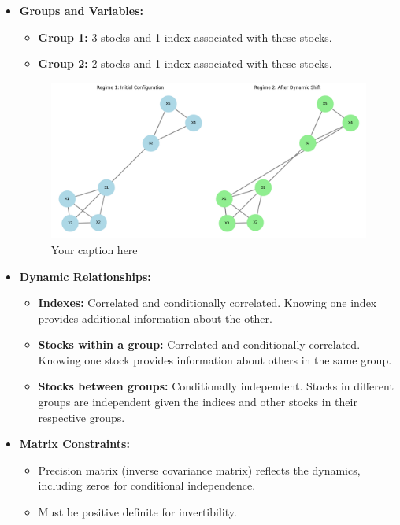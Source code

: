 \documentclass{article}
\begin{document}
\begin{itemize}
    \item \textbf{Groups and Variables:}
    \begin{itemize}
        \item \textbf{Group 1:} 3 stocks and 1 index associated with these stocks.
        \item \textbf{Group 2:} 2 stocks and 1 index associated with these stocks.
    \end{itemize}

    \begin{figure}[h!]
    \centering
    \includegraphics[width=\textwidth]{synthetic_data.png}
    \caption{Your caption here}
    \label{fig:label}
\end{figure}


    \item \textbf{Dynamic Relationships:}
    \begin{itemize}
        \item \textbf{Indexes:} Correlated and conditionally correlated. Knowing one index provides additional information about the other.
        \item \textbf{Stocks within a group:} Correlated and conditionally correlated. Knowing one stock provides information about others in the same group.
        \item \textbf{Stocks between groups:} Conditionally independent. Stocks in different groups are independent given the indices and other stocks in their respective groups.
    \end{itemize}
    \item \textbf{Matrix Constraints:}
    \begin{itemize}
        \item Precision matrix (inverse covariance matrix) reflects the dynamics, including zeros for conditional independence.
        \item Must be positive definite for invertibility.
    \end{itemize}
\end{itemize}
\end{document}

